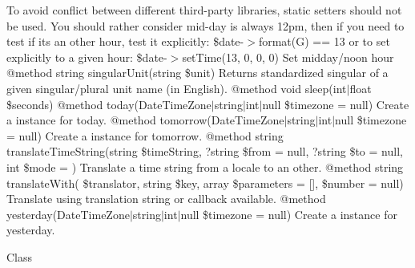 \begin{DoxyRefList}
To avoid conflict between different third-\/party libraries, static setters should not be used. You should rather consider mid-\/day is always 12pm, then if you need to test if it\textquotesingle{}s an other hour, test it explicitly\+: \$date-\/\texorpdfstring{$>$}{>}format(\textquotesingle{}G\textquotesingle{}) == 13 or to set explicitly to a given hour\+: \$date-\/\texorpdfstring{$>$}{>}set\+Time(13, 0, 0, 0) Set midday/noon hour @method string singular\+Unit(string \$unit) Returns standardized singular of a given singular/plural unit name (in English). @method void sleep(int\texorpdfstring{$\vert$}{|}float \$seconds) @method  today(Date\+Time\+Zone\texorpdfstring{$\vert$}{|}string\texorpdfstring{$\vert$}{|}int\texorpdfstring{$\vert$}{|}null \$timezone = null) Create a  instance for today. @method  tomorrow(Date\+Time\+Zone\texorpdfstring{$\vert$}{|}string\texorpdfstring{$\vert$}{|}int\texorpdfstring{$\vert$}{|}null \$timezone = null) Create a  instance for tomorrow. @method string translate\+Time\+String(string \$time\+String, ?string \$from = null, ?string \$to = null, int \$mode = ) Translate a time string from a locale to an other. @method string translate\+With( \$translator, string \$key, array \$parameters = \mbox{[}\mbox{]}, \$number = null) Translate using translation string or callback available. @method  yesterday(Date\+Time\+Zone\texorpdfstring{$\vert$}{|}string\texorpdfstring{$\vert$}{|}int\texorpdfstring{$\vert$}{|}null \$timezone = null) Create a  instance for yesterday. 
\item[Class \doxylink{class_carbon_1_1_factory_immutable}{Factory\+Immutable} ]\hfill \\
\label{deprecated__deprecated000208}%
%

\end{DoxyRefList}
